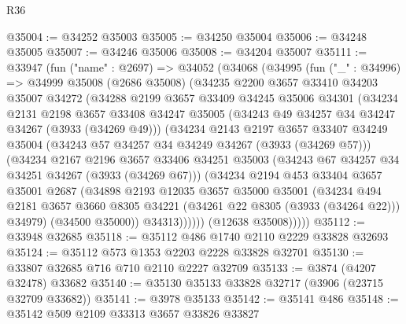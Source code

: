 \begin{lexlean}{R36}
\begin{coremodule}
@35004 := @34252 @35003
@35005 := @34250 @35004
@35006 := @34248 @35005
@35007 := @34246 @35006
@35008 := @34204 @35007
@35111 := @33947
    (fun ("name" : @2697) =>
    @34052
      (@34068
        (@34995
          (fun ("_" : @34996) =>
          @34999
            @35008
            (@2686 @35008)
            (@34235
              @2200
              @3657
              @33410
              @34203
              @35007
              @34272
              (@34288
                @2199
                @3657
                @33409
                @34245
                @35006
                @34301
                (@34234
                  @2131
                  @2198
                  @3657
                  @33408
                  @34247
                  @35005
                  (@34243 @49 @34257 @34 @34247 @34267 (@3933 (@34269 @49)))
                  (@34234
                    @2143
                    @2197
                    @3657
                    @33407
                    @34249
                    @35004
                    (@34243 @57 @34257 @34 @34249 @34267 (@3933 (@34269 @57)))
                    (@34234
                      @2167
                      @2196
                      @3657
                      @33406
                      @34251
                      @35003
                      (@34243 @67 @34257 @34 @34251 @34267 (@3933 (@34269 @67)))
                      (@34234
                        @2194
                        @453
                        @33404
                        @3657
                        @35001
                        @2687
                        (@34898
                          @2193
                          @12035
                          @3657
                          @35000
                          @35001
                          (@34234
                            @494
                            @2181
                            @3657
                            @3660
                            @8305
                            @34221
                            (@34261 @22 @8305 (@3933 (@34264 @22)))
                            @34979)
                          (@34500 @35000))
                        @34313))))))
            (@12638 @35008)))))
@35112 := @33948 @32685
@35118 := @35112 @486 @1740 @2110 @2229 @33828 @32693
@35124 := @35112 @573 @1353 @2203 @2228 @33828 @32701
@35130 := @33807 @32685 @716 @710 @2110 @2227 @32709
@35133 := @3874 (@4207 @32478) @33682
@35140 := @35130 @35133 @33828 @32717 (@3906 (@23715 @32709 @33682))
@35141 := @3978 @35133
@35142 := @35141 @486
@35148 := @35142 @509 @2109 @33313 @3657 @33826 @33827

\end{coremodule}
\end{lexlean}
